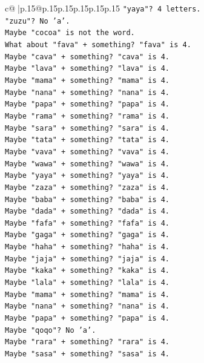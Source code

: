 \documentclass{article}
\begin{document}
{\begin{supertabular}{c@{$\;$}|p{.15\linewidth}@{}p{.15\linewidth}p{.15\linewidth}p{.15\linewidth}p{.15\linewidth}p{.15\linewidth}}
{{{\texttt{"yaya"? 4 letters.} \\
\texttt{"zuzu"? No 'a'.} \\
\texttt{Maybe "cocoa" is not the word.} \\
\texttt{What about "fava" + something? "fava" is 4.} \\
\texttt{Maybe "cava" + something? "cava" is 4.} \\
\texttt{Maybe "lava" + something? "lava" is 4.} \\
\texttt{Maybe "mama" + something? "mama" is 4.} \\
\texttt{Maybe "nana" + something? "nana" is 4.} \\
\texttt{Maybe "papa" + something? "papa" is 4.} \\
\texttt{Maybe "rama" + something? "rama" is 4.} \\
\texttt{Maybe "sara" + something? "sara" is 4.} \\
\texttt{Maybe "tata" + something? "tata" is 4.} \\
\texttt{Maybe "vava" + something? "vava" is 4.} \\
\texttt{Maybe "wawa" + something? "wawa" is 4.} \\
\texttt{Maybe "yaya" + something? "yaya" is 4.} \\
\texttt{Maybe "zaza" + something? "zaza" is 4.} \\
\texttt{Maybe "baba" + something? "baba" is 4.} \\
\texttt{Maybe "dada" + something? "dada" is 4.} \\
\texttt{Maybe "fafa" + something? "fafa" is 4.} \\
\texttt{Maybe "gaga" + something? "gaga" is 4.} \\
\texttt{Maybe "haha" + something? "haha" is 4.} \\
\texttt{Maybe "jaja" + something? "jaja" is 4.} \\
\texttt{Maybe "kaka" + something? "kaka" is 4.} \\
\texttt{Maybe "lala" + something? "lala" is 4.} \\
\texttt{Maybe "mama" + something? "mama" is 4.} \\
\texttt{Maybe "nana" + something? "nana" is 4.} \\
\texttt{Maybe "papa" + something? "papa" is 4.} \\
\texttt{Maybe "qoqo"? No 'a'.} \\
\texttt{Maybe "rara" + something? "rara" is 4.} \\
\texttt{Maybe "sasa" + something? "sasa" is 4.} \\
}}}
\end{supertabular}}
\end{document}
